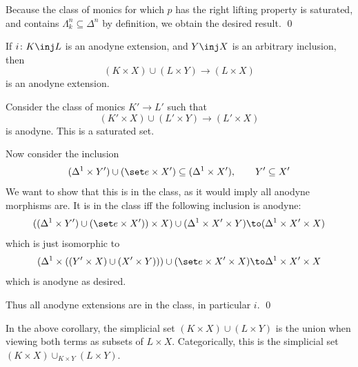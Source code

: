 \ecoro

\bproof

    Because the class of monics for which $p$ has the right lifting property is saturated, and contains
    $\Lambda^n_k\subseteq\Delta^n$ by definition, we obtain the desired result.
    \qed

\eproof

\bcoro[name={prodanodyne}]

    If $i\colon K\inj L$ is an anodyne extension, and $Y\inj X$ is an arbitrary inclusion, then
    $$ (K\times X)\cup(L\times Y) \to (L\times X) $$
    is an anodyne extension.

\ecoro

\bproof

    Consider the class of monics $K'\to L'$ such that
    $$ (K'\times X)\cup(L'\times Y) \to (L'\times X) $$
    is anodyne.
    This is a saturated set.

    Now consider the inclusion
    $$ (\Delta^1\times Y')\cup(\set e\times X')\subseteq(\Delta^1\times X'),\qquad Y'\subseteq X' $$
    We want to show that this is in the class, as it would imply all anodyne morphisms are.
    It is in the class iff the following inclusion is anodyne:
    $$ ((\Delta^1\times Y')\cup(\set e\times X'))\times X)\cup(\Delta^1\times X'\times Y) \to (\Delta^1\times X'\times X) $$
    which is just isomorphic to
    $$ (\Delta^1\times((Y'\times X)\cup(X'\times Y)))\cup(\set e\times X'\times X) \to \Delta^1\times X'\times X $$
    which is anodyne as desired.

    Thus all anodyne extensions are in the class, in particular $i$.
    \qed

\eproof

\bnote

    In the above corollary, the simplicial set $(K\times X)\cup(L\times Y)$ is the union when viewing both terms as subsets
    of $L\times X$.
    Categorically, this is the simplicial set $(K\times X)\cup_{K\times Y}(L\times Y)$.

\enote

